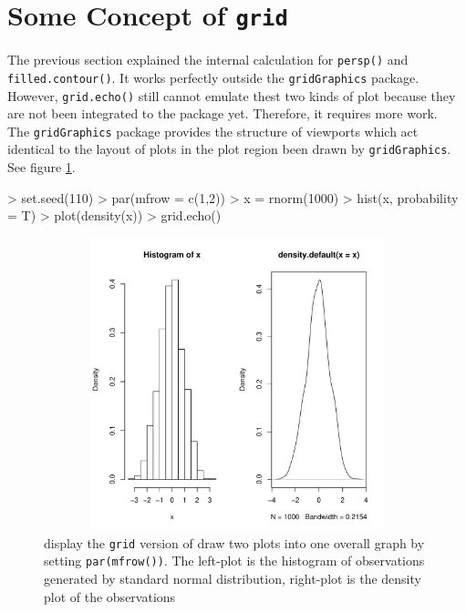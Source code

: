 \documentclass[paper=a4, fontsize=11pt]{report}
\begin{document}
\section{Some Concept of \texttt{grid}}
The previous section explained the internal calculation for \texttt{persp()} and \texttt{filled.contour()}. It works perfectly outside the \texttt{gridGraphics} package. However, \texttt{grid.echo()} still cannot emulate thest two kinds of plot because they are not been integrated to the package yet. Therefore, it requires more work.\\ 
The \texttt{gridGraphics} package provides the structure of viewports which act identical to the layout of plots in the plot region been drawn by \texttt{gridGraphics}. See figure \ref{figure_hist}.
\begin{Schunk}
\begin{Sinput}
> set.seed(110)
> par(mfrow = c(1,2))
> x = rnorm(1000)
> hist(x, probability = T)
> plot(density(x))
> grid.echo()
\end{Sinput}
\end{Schunk}
\begin{figure}[h]
\begin{center}
  \includegraphics[height = 8.5cm, width = 15cm]{figure/viewport_demo_1.pdf}
  \caption{display the \texttt{grid} version of draw two plots into one overall graph by setting \texttt{par(mfrow())}. The left-plot is the histogram of observations generated by standard normal distribution, right-plot is the density plot of the observations}
  	\label{figure_hist}
\end{center}
\end{figure}
\end{document}
